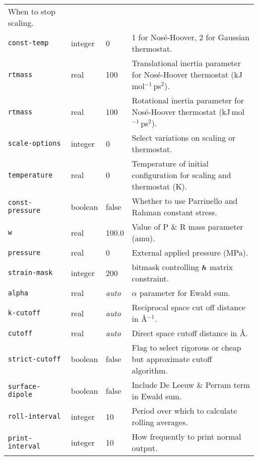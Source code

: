 \documentclass[twoside]{report}
\newcommand{\bm}[1]{\mbox{\boldmath \protect\(#1\protect\)}}
\begin{document}
\begin{table}
\begin{minipage}{\textwidth}
\begin{tabular}{|l|l|l|p{2.9in}|}
When to stop scaling. \\
\texttt{const-temp} &             integer &               0 &
1 for Nos\'e-Hoover, 2 for Gaussian thermostat. \\
\texttt{rtmass} &                 real &                  100 &
Translational inertia parameter for Nos\'e-Hoover thermostat 
(kJ\,mol$^{-1}$\,ps$^2$).\\
\texttt{rtmass} &                 real &                  100 &
Rotational inertia parameter for Nos\'e-Hoover thermostat 
(kJ\,mol$^{-1}$\,ps$^2$).\\
\texttt{scale-options} &           integer &              0  &
Select variations on scaling or thermostat. \\
\texttt{temperature} &            real &                  0 &
Temperature of initial configuration for scaling and thermostat (K). \\ \hline
\texttt{const-pressure} &         boolean &               false  &
Whether to use Parrinello and Rahman constant stress. \\
\texttt{w} &                      real &                  100.0 &
Value of P \& R mass parameter (amu). \\
\texttt{pressure} &               real &                  0 &
External applied pressure (MPa). \\
\texttt{strain-mask} &            integer &               200 &
bitmask controlling $\bm{h}$ matrix constraint. \\ \hline
\texttt{alpha} &                  real &                  {\em auto} &
$\alpha$ parameter for Ewald sum. \\
\texttt{k-cutoff} &               real &                  {\em auto} &
Reciprocal space cut off distance in \AA$^{-1}$. \\
\texttt{cutoff} &                 real &                  {\em auto} &
Direct space cutoff distance in \AA. \\
\texttt{strict-cutoff} &          boolean &               false &
Flag to select rigorous or cheap but approximate cutoff algorithm. \\
\texttt{surface-dipole} & boolean &               false  &
Include De Leeuw \& Perram term in Ewald sum. \\ \hline
\texttt{roll-interval} &          integer &               10 &
Period over which to calculate rolling averages. \\
\texttt{print-interval} &         integer &               10 &
How frequently to print normal output. \\ \hline
\end{tabular}
\end{minipage}
\end{table}
\end{document}
